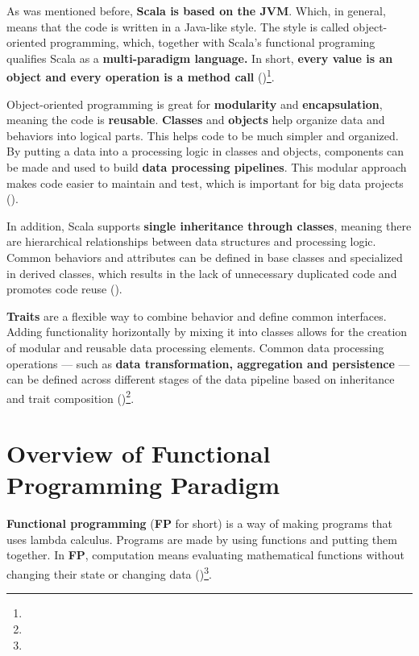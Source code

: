 As was mentioned before, \textbf{Scala is based on the JVM}. Which, in general, means that the code is written in a Java-like style. The style is called object-oriented programming, which, together with Scala’s functional programing qualifies Scala as a \textbf{multi-paradigm language.} In short, \textbf{every value is an object and every operation is a method call} (\cite{joshuad.suerethScalaDepth2012})\footnote[4]{}.

Object-oriented programming is great for \textbf{modularity} and \textbf{encapsulation}, meaning the code is \textbf{reusable}. \textbf{Classes} and \textbf{objects} help organize data and behaviors into logical parts. This helps code to be much simpler and organized. By putting a data into a processing logic in classes and objects, components can be made and used to build \textbf{data processing pipelines}. This modular approach makes code easier to maintain and test, which is important for big data projects (\cite{ghoshDSLsAction2011})\footnotemark[3].

In addition, Scala supports \textbf{single inheritance through classes}, meaning there are hierarchical relationships between data structures and processing logic. Common behaviors and attributes can be defined in base classes and specialized in derived classes, which results in the lack of unnecessary duplicated code and promotes code reuse (\cite{ghoshDSLsAction2011})\footnotemark[3].

\textbf{Traits} are a flexible way to combine behavior and define common interfaces. Adding functionality horizontally by mixing it into classes allows for the creation of modular and reusable data processing elements. Common data processing operations — such as \textbf{data transformation, aggregation and persistence} — can be defined across different stages of the data pipeline based on inheritance and trait composition (\cite{ghoshDSLsAction2011})\footnote[3]{}.



\section{Overview of Functional Programming Paradigm}

\textbf{Functional programming} (\textbf{FP} for short) is a way of making programs that uses lambda calculus. Programs are made by using functions and putting them together. In \textbf{FP}, computation means evaluating mathematical functions without changing their state or changing data (\cite{StenbergFunctionalAI})\footnote[5]{}.

